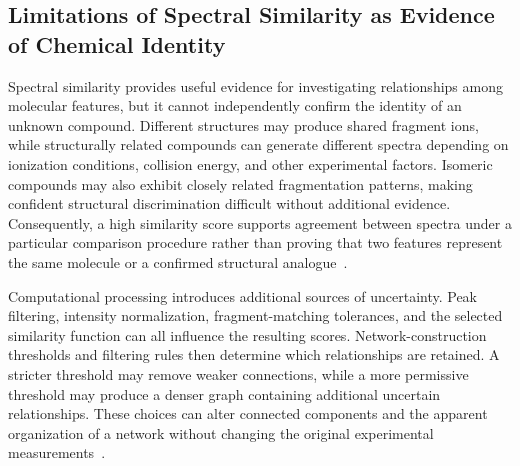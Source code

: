     \subsection{Limitations of Spectral Similarity as Evidence of Chemical Identity}\label{subsec:spectral-limitations}


        Spectral similarity provides useful evidence for investigating relationships among molecular features, but it cannot independently confirm the identity of an unknown compound. Different structures may produce shared fragment ions, while structurally related compounds can generate different spectra depending on ionization conditions, collision energy, and other experimental factors. Isomeric compounds may also exhibit closely related fragmentation patterns, making confident structural discrimination difficult without additional evidence. Consequently, a high similarity score supports agreement between spectra under a particular comparison procedure rather than proving that two features represent the same molecule or a confirmed structural analogue~\cite{Bittremieux2022,Hupatz2025}.

        Computational processing introduces additional sources of uncertainty. Peak filtering, intensity normalization, fragment-matching tolerances, and the selected similarity function can all influence the resulting scores. Network-construction thresholds and filtering rules then determine which relationships are retained. A stricter threshold may remove weaker connections, while a more permissive threshold may produce a denser graph containing additional uncertain relationships. These choices can alter connected components and the apparent organization of a network without changing the original experimental measurements~\cite{Wang2016,Nothias2020,DallaValle2025}.

